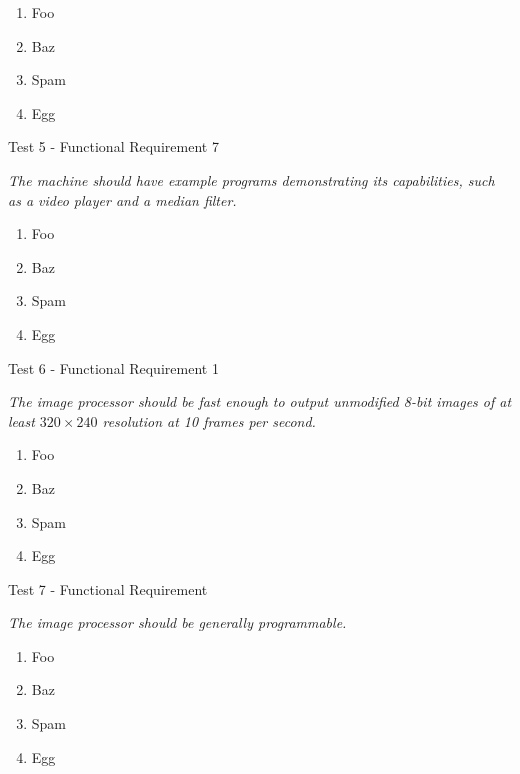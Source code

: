 \begin{enumerate}
\item Foo
\item Baz
\item Spam
\item Egg
\end{enumerate}

{\sc Test 5 - Functional Requirement 7}

{\em The machine should have example programs demonstrating its capabilities,
  such as a video player and a median filter.}

\begin{enumerate}
\item Foo
\item Baz
\item Spam
\item Egg
\end{enumerate}

{\sc Test 6 - Functional Requirement 1}

{\em The image processor should be fast enough to output unmodified 8-bit
  images of at least $320\times240$ resolution at 10 frames per second.}

\begin{enumerate}
\item Foo
\item Baz
\item Spam
\item Egg
\end{enumerate}

{\sc Test 7 - Functional Requirement }

{\em The image processor should be generally programmable.}

\begin{enumerate}
\item Foo
\item Baz
\item Spam
\item Egg
\end{enumerate}
